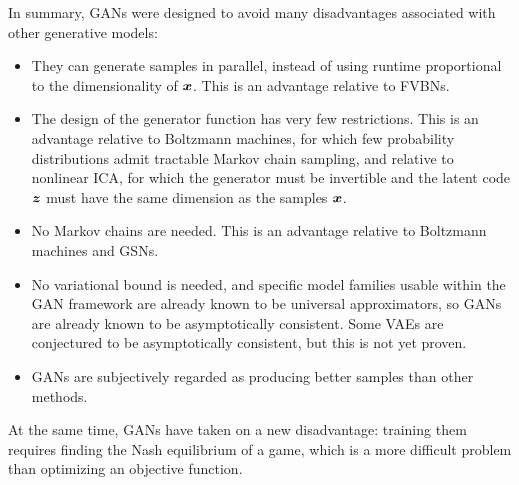 In summary, GANs were designed to avoid many disadvantages associated with other generative
models:
\begin{itemize}
  \item They can generate samples in parallel, instead of using runtime proportional to the
    dimensionality of ${\bm{x}}$. This is an advantage relative to FVBNs.
  \item The design of the generator function has very few restrictions. This is an advantage
    relative to Boltzmann machines, for which few probability distributions admit tractable
    Markov chain sampling, and relative to nonlinear ICA, for which the generator must be
    invertible and the latent code ${\bm{z}}$ must have the same dimension as the samples
    ${\bm{x}}$.
  \item No Markov chains are needed. This is an advantage relative to Boltzmann machines and GSNs.
  \item No variational bound is needed, and specific model families usable within the GAN
    framework are already known to be universal approximators, so GANs are already known
    to be asymptotically consistent.
    Some VAEs are conjectured to be asymptotically consistent, but this is not yet proven.
  \item GANs are subjectively regarded as producing better samples than other methods.
\end{itemize}
At the same time, GANs have taken on a new disadvantage: training them requires finding
the Nash equilibrium of a game, which is a more difficult problem than optimizing an
objective function.
